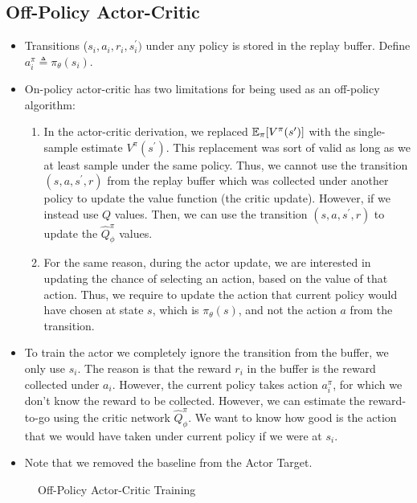 \documentclass{article}
\begin{document}
\subsection{Off-Policy Actor-Critic}
\begin{itemize}
    \item Transitions ($s_i, a_i, r_i, s^\prime_i)$ under any policy is stored in the replay buffer. Define $a_i^\pi \triangleq \pi_\theta(s_i)$.
    \item On-policy actor-critic has two limitations for being used as an off-policy algorithm:
    \begin{enumerate}
        \item In the actor-critic derivation, we replaced ${\mathbb E}_\pi[V^\pi(s^\prime)]$ with the single-sample estimate $V^\pi(s^\prime)$. This replacement was sort of valid as long as we at least sample under the same policy. Thus, we cannot use the transition $(s,a,s^\prime, r)$ from the replay buffer which was collected under another policy to update the value function (the critic update).
        However, if we instead use $Q$ values. Then, we can use the transition $(s,a,s^\prime, r)$ to update the $\hat Q_\phi^\pi$ values.        
        \item For the same reason, during the actor update, we are interested in updating the chance of selecting an action, based on the value of that action. Thus, we require to update the action that current policy would have chosen at state $s$, which is $\pi_\theta(s)$, and not the action $a$ from the transition.
    \end{enumerate}
    
    \item To train the actor we completely ignore the transition from the buffer, we only use $s_i$. The reason is that the reward $r_i$ in the buffer is the reward collected under $a_i$. However, the current policy takes action $a_i^\pi$, for which we don't know the reward to be collected. However, we can estimate the reward-to-go using the critic network $\hat Q_\phi^\pi$. We want to know how good is the action that we would have taken under current policy if we were at $s_i$.
    \item Note that we removed the baseline from the Actor Target. 
    \end{itemize}

\begin{figure}[ht]
\caption{Off-Policy Actor-Critic Training}\label{fig:off_policy_actor_critic}
\end{figure} 
\end{document}
